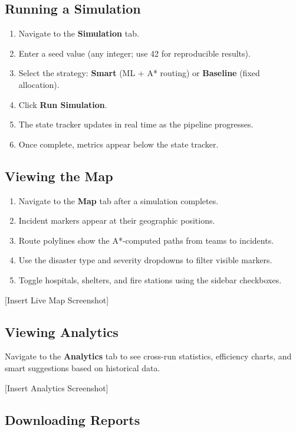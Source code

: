\subsection{Running a Simulation}

\begin{enumerate}[leftmargin=*]
    \item Navigate to the \textbf{Simulation} tab.
    \item Enter a seed value (any integer; use 42 for reproducible results).
    \item Select the strategy: \textbf{Smart} (ML + A* routing) or \textbf{Baseline} (fixed allocation).
    \item Click \textbf{Run Simulation}.
    \item The state tracker updates in real time as the pipeline progresses.
    \item Once complete, metrics appear below the state tracker.
\end{enumerate}

\subsection{Viewing the Map}

\begin{enumerate}[leftmargin=*]
    \item Navigate to the \textbf{Map} tab after a simulation completes.
    \item Incident markers appear at their geographic positions.
    \item Route polylines show the A*-computed paths from teams to incidents.
    \item Use the disaster type and severity dropdowns to filter visible markers.
    \item Toggle hospitals, shelters, and fire stations using the sidebar checkboxes.
\end{enumerate}

[Insert Live Map Screenshot]

\subsection{Viewing Analytics}

Navigate to the \textbf{Analytics} tab to see cross-run statistics, efficiency charts, and smart suggestions based on historical data.

[Insert Analytics Screenshot]

\subsection{Downloading Reports}

